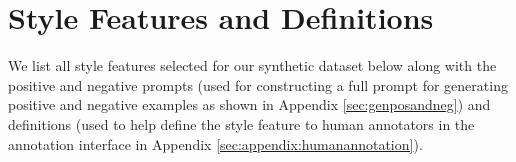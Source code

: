 \section{Style Features and Definitions}
\label{sec:appendix:stylefeatures}
We list all style features selected for our synthetic dataset below along with the positive and negative prompts (used for constructing a full prompt for generating positive and negative examples as shown in Appendix \ref{sec:genposandneg}) and definitions (used to help define the style feature to human annotators in the annotation interface in Appendix \ref{sec:appendix:humanannotation}).

\stylefeaturestable
